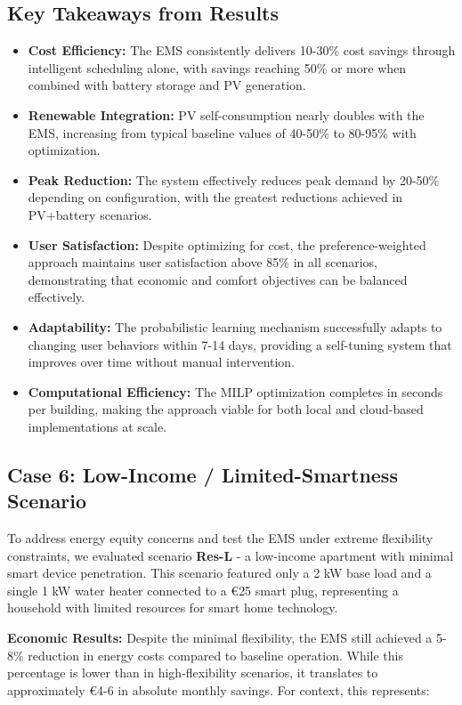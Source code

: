 \documentclass[12pt,a4paper]{article}
\begin{document}
\subsection{Key Takeaways from Results}
\begin{itemize}
    \item \textbf{Cost Efficiency:} The EMS consistently delivers 10-30\% cost savings through intelligent scheduling alone, with savings reaching 50\% or more when combined with battery storage and PV generation.
    \item \textbf{Renewable Integration:} PV self-consumption nearly doubles with the EMS, increasing from typical baseline values of 40-50\% to 80-95\% with optimization.
    \item \textbf{Peak Reduction:} The system effectively reduces peak demand by 20-50\% depending on configuration, with the greatest reductions achieved in PV+battery scenarios.
    \item \textbf{User Satisfaction:} Despite optimizing for cost, the preference-weighted approach maintains user satisfaction above 85\% in all scenarios, demonstrating that economic and comfort objectives can be balanced effectively.
    \item \textbf{Adaptability:} The probabilistic learning mechanism successfully adapts to changing user behaviors within 7-14 days, providing a self-tuning system that improves over time without manual intervention.
    \item \textbf{Computational Efficiency:} The MILP optimization completes in seconds per building, making the approach viable for both local and cloud-based implementations at scale.
\end{itemize}

\subsection{Case 6: Low-Income / Limited-Smartness Scenario}

To address energy equity concerns and test the EMS under extreme flexibility constraints, we evaluated scenario \textbf{Res-L} - a low-income apartment with minimal smart device penetration. This scenario featured only a 2 kW base load and a single 1 kW water heater connected to a \euro{25} smart plug, representing a household with limited resources for smart home technology.

\textbf{Economic Results:} Despite the minimal flexibility, the EMS still achieved a 5-8\% reduction in energy costs compared to baseline operation. While this percentage is lower than in high-flexibility scenarios, it translates to approximately \euro{4-6} in absolute monthly savings. For context, this represents:
\end{document}
